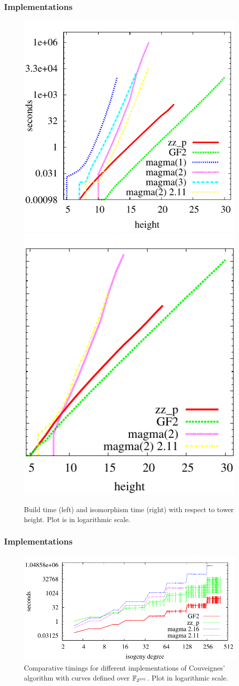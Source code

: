 \documentclass[10pt]{beamer}
\begin{document}

\begin{frame}
  \frametitle{Implementations}
  
  \begin{figure}
    \centering
    \includegraphics[height=0.5\textwidth]{../artin/build1}
    \includegraphics[height=0.5\textwidth]{../artin/iso1}
    
    \caption{Build time (left) and isomorphism time (right) with respect to tower height. Plot is in logarithmic scale.}
    \label{fig:height}
  \end{figure}
\end{frame}


\begin{frame}
  \frametitle{Implementations}

  \begin{figure}
    \centering
    \includegraphics[width=\textwidth]{../isogeny/p2}
    \caption{Comparative timings for different implementations of
      Couveignes' algorithm with curves defined over
      $\mathbb{F}_{2^{101}}$. Plot in logarithmic scale.}
    \label{fig:2-101}
  \end{figure}
\end{frame}
\end{document}
